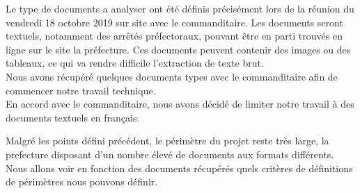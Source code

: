 
Le type de documents a analyser ont été définis précisément lors de la réunion du vendredi 18 octobre 2019 sur site avec le commanditaire.
Les documents seront textuels, notamment des arrêtés préfectoraux, pouvant être en parti trouvés en ligne sur le site la préfecture.
Ces documents peuvent contenir des images ou des tableaux, ce qui va rendre difficile l'extraction de texte brut.
\\
Nous avons récupéré quelques documents types avec le commanditaire afin de commencer notre travail technique.
\\
En accord avec le commanditaire, nous avons décidé de limiter notre travail à des documents textuels en français.
\\
\par
Malgré les points défini précédent, le périmètre du projet reste très large, la prefecture disposant d'un nombre élevé de documents aux formats différents.
Nous allons voir en fonction des documents récupérés quels critères de définitions de périmètres nous pouvons définir.


